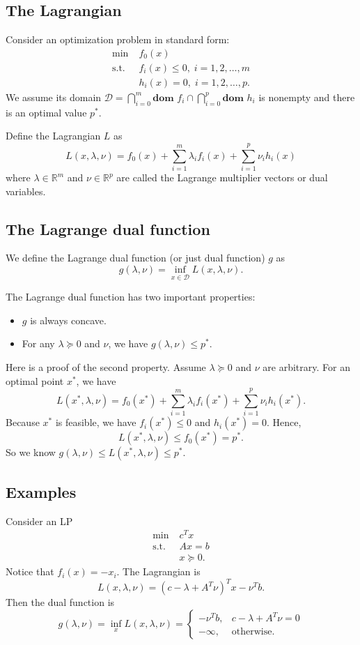 \documentclass[lang=en,color=blue,mode=fancy,titlestyle=hang]{elegantbook}
\begin{document}
\subsection{The Lagrangian}

Consider an optimization problem in standard form:
\begin{align*}
\min \; &f_0(x)\\
\text{s.t.} \; &f_i(x) \leq 0, \; i = 1, 2, \ldots, m\\
&h_i(x) = 0, \; i = 1, 2, \ldots, p.
\end{align*}
We assume its domain $\mathcal{D} = \bigcap_{i = 0}^m \textbf{dom } f_i \cap \bigcap_{i = 0}^p \textbf{dom } h_i$
is nonempty and there is an optimal value $p^*$.

Define the Lagrangian $L$ as
\[
L(x, \lambda, \nu) = f_0(x) + \sum_{i=1}^m \lambda_i f_i(x) + \sum_{i=1}^p \nu_i h_i(x)
\]
where $\lambda \in \mathbb{R}^m$ and $\nu \in \mathbb{R}^p$ are called the Lagrange
multiplier vectors or dual variables.

\subsection{The Lagrange dual function}

We define the Lagrange dual function (or just dual function) $g$ as
\[
g(\lambda, \nu) = \inf_{x \in \mathcal{D}} L(x, \lambda, \nu).
\]

The Lagrange dual function has two important properties:
\begin{itemize}
  \item $g$ is always concave.
  \item For any $\lambda \succeq 0$ and $\nu$, we have $g(\lambda, \nu) \leq p^*$.
\end{itemize}

Here is a proof of the second property. Assume $\lambda \succeq 0$ and $\nu$ are arbitrary.
For an optimal point $x^*$, we have
\[
L(x^*, \lambda, \nu) = f_0(x^*) + \sum_{i=1}^m \lambda_i f_i(x^*) + \sum_{i=1}^p \nu_i h_i(x^*).
\]
Because $x^*$ is feasible, we have $f_i(x^*) \leq 0$ and $h_i(x^*) = 0$. Hence,
\[
L(x^*, \lambda, \nu) \leq f_0(x^*) = p^*.
\]
So we know $g(\lambda, \nu) \leq L(x^*, \lambda, \nu) \leq p^*$.

\subsection{Examples}
Consider an LP
\begin{align*}
\min \; &c^T x\\
\text{s.t.} \; &Ax = b\\
&x \succeq 0.
\end{align*}
Notice that $f_i(x) = -x_i$. The Lagrangian is
\[
L(x, \lambda, \nu) = (c - \lambda + A^T \nu)^T x - \nu^T b.
\]
Then the dual function is
\[
g(\lambda, \nu) = \inf_{x} L(x, \lambda, \nu) =
\begin{cases}
- \nu^T b, & c - \lambda + A^T \nu = 0\\
- \infty, & \text{otherwise}.
\end{cases}
\]
\end{document}
